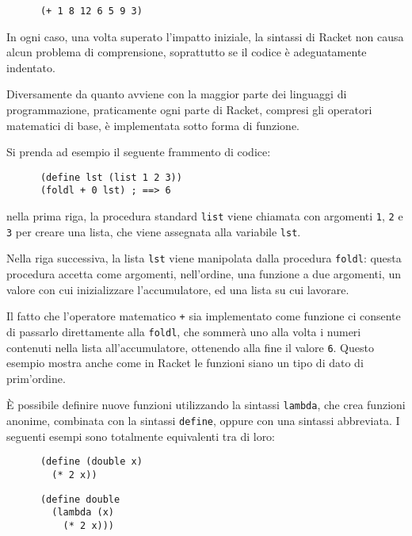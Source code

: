 \begin{lstlisting}
      (+ 1 8 12 6 5 9 3)
\end{lstlisting}

In ogni caso, una volta superato l'impatto iniziale, la sintassi di
Racket non causa alcun problema di comprensione, soprattutto se il
codice \`e adeguatamente indentato.

Diversamente da quanto avviene con la maggior parte dei linguaggi di
programmazione, praticamente ogni parte di Racket, compresi gli operatori
matematici di base, \`e implementata sotto forma di funzione.

Si prenda ad esempio il seguente frammento di codice:

\begin{lstlisting}
      (define lst (list 1 2 3))
      (foldl + 0 lst) ; ==> 6
\end{lstlisting}

nella prima riga, la procedura standard \lstinline{list} viene chiamata
con argomenti \lstinline{1}, \lstinline{2} e \lstinline{3} per creare una
lista, che viene assegnata alla variabile \lstinline{lst}.

Nella riga successiva, la lista \lstinline{lst} viene manipolata dalla
procedura \lstinline{foldl}: questa procedura accetta come argomenti,
nell'ordine, una funzione a due argomenti, un valore con cui
inizializzare l'accumulatore, ed una lista su cui lavorare.

Il fatto che l'operatore matematico \lstinline{+} sia implementato come
funzione ci consente di passarlo direttamente alla \lstinline{foldl}, che
sommer\`a uno alla volta i numeri contenuti nella lista all'accumulatore,
ottenendo alla fine il valore \lstinline{6}. Questo esempio mostra anche
come in Racket le funzioni siano un tipo di dato di prim'ordine.

\`E possibile definire nuove funzioni utilizzando la sintassi
\lstinline{lambda}, che crea funzioni anonime, combinata con la sintassi
\lstinline{define}, oppure con una sintassi abbreviata. I seguenti esempi
sono totalmente equivalenti tra di loro:

\begin{lstlisting}
      (define (double x)
        (* 2 x))
\end{lstlisting}

\begin{lstlisting}
      (define double
        (lambda (x)
          (* 2 x)))
\end{lstlisting}


